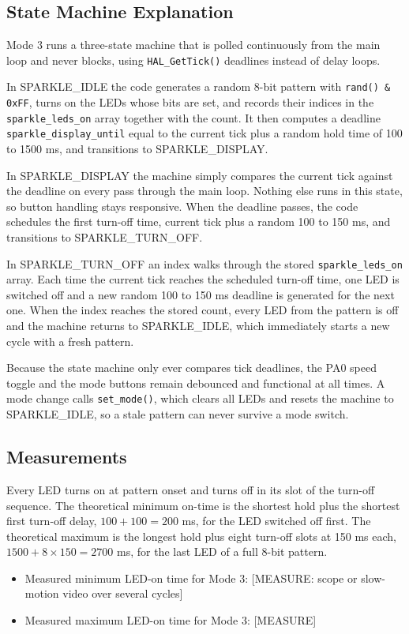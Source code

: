 \documentclass[11pt]{article}
\begin{document}
\subsection{State Machine Explanation}
Mode 3 runs a three-state machine that is polled continuously from the main loop and never blocks, using \texttt{HAL\_GetTick()} deadlines instead of delay loops.

In SPARKLE\_IDLE the code generates a random 8-bit pattern with \texttt{rand() \& 0xFF}, turns on the LEDs whose bits are set, and records their indices in the \texttt{sparkle\_leds\_on} array together with the count. It then computes a deadline \texttt{sparkle\_display\_until} equal to the current tick plus a random hold time of 100 to 1500 ms, and transitions to SPARKLE\_DISPLAY.

In SPARKLE\_DISPLAY the machine simply compares the current tick against the deadline on every pass through the main loop. Nothing else runs in this state, so button handling stays responsive. When the deadline passes, the code schedules the first turn-off time, current tick plus a random 100 to 150 ms, and transitions to SPARKLE\_TURN\_OFF.

In SPARKLE\_TURN\_OFF an index walks through the stored \texttt{sparkle\_leds\_on} array. Each time the current tick reaches the scheduled turn-off time, one LED is switched off and a new random 100 to 150 ms deadline is generated for the next one. When the index reaches the stored count, every LED from the pattern is off and the machine returns to SPARKLE\_IDLE, which immediately starts a new cycle with a fresh pattern.

Because the state machine only ever compares tick deadlines, the PA0 speed toggle and the mode buttons remain debounced and functional at all times. A mode change calls \texttt{set\_mode()}, which clears all LEDs and resets the machine to SPARKLE\_IDLE, so a stale pattern can never survive a mode switch.

\subsection{Measurements}
Every LED turns on at pattern onset and turns off in its slot of the turn-off sequence. The theoretical minimum on-time is the shortest hold plus the shortest first turn-off delay, $100 + 100 = 200$ ms, for the LED switched off first. The theoretical maximum is the longest hold plus eight turn-off slots at 150 ms each, $1500 + 8 \times 150 = 2700$ ms, for the last LED of a full 8-bit pattern.
\begin{itemize}
    \item Measured minimum LED-on time for Mode 3: [MEASURE: scope or slow-motion video over several cycles]
    \item Measured maximum LED-on time for Mode 3: [MEASURE]
\end{itemize}
\end{document}
